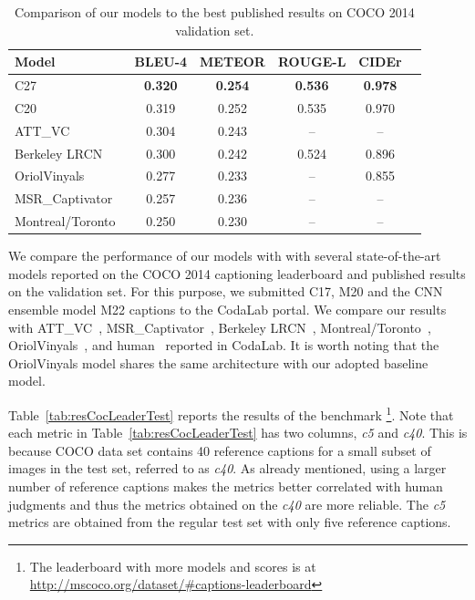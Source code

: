 \begin{table}[htp]
  \centering
  \begin{adjustbox}{center}
  \begin{tabular}{|l|c|c|c|c|c|}
    \hline\hline
    \bf Model  &BLEU-4 &METEOR &ROUGE-L&CIDEr\\\hline
    C27 & \bf0.320&\bf0.254 &\bf0.536 &\bf0.978 \\
    C20 & 0.319 & 0.252 & 0.535 & 0.970 \\\hline
    ATT\_VC~\cite{you2016image} & 0.304& 0.243& -- & -- \\
    Berkeley LRCN~\cite{donahue2015long} & 0.300& 0.242& 0.524 & 0.896 \\
    OriolVinyals~\cite{Vinyals_2015_CVPR} & 0.277& 0.233& -- & 0.855 \\
    MSR\_Captivator~\cite{Fang2015} & 0.257& 0.236& -- & -- \\
    Montreal/Toronto~\cite{Xu2015show} & 0.250& 0.230& -- & -- \\
    \hline \hline
  \end{tabular}
  \end{adjustbox}
  \caption{Comparison of our models to the best published results on COCO 2014 validation set.}
  \label{tab:resCocPubVal}
\end{table}

We compare the performance of our models with with several state-of-the-art
models reported on the COCO 2014 captioning leaderboard and published results on
the validation set.
For this purpose, we submitted C17, M20 and the CNN ensemble model M22 captions
to the CodaLab portal.
We compare our results with ATT\_VC~\cite{you2016image},
MSR\_Captivator~\cite{Fang2015}, Berkeley LRCN~\cite{donahue2015long},
Montreal/Toronto~\cite{Xu2015show}, OriolVinyals~\cite{Vinyals_2015_CVPR}, and
human~\cite{Chen2015} reported in CodaLab. It is worth noting that the
OriolVinyals model shares the same architecture with our adopted baseline model.

Table~\ref{tab:resCocLeaderTest} reports the results of the benchmark%
\footnote{The leaderboard with more models and
scores is at \url{http://mscoco.org/dataset/\#captions-leaderboard}}.
Note that each metric in Table~\ref{tab:resCocLeaderTest} has two columns, \emph{c5}
and \emph{c40}. 
This is because COCO data set contains 40 reference captions for a small subset
of images in the test set, referred to as \emph{c40}. 
As already mentioned, using a larger number of reference captions makes the
metrics better correlated with human judgments and thus the metrics obtained on
the \emph{c40} are more reliable.
The \emph{c5} metrics are obtained from the regular test set with only five
reference captions. 

